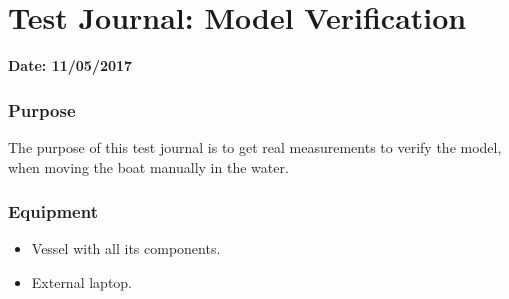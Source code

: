 \chapter{Test Journal: Model Verification}

\textbf{Date: 11/05/2017}

\subsection*{Purpose}
The purpose of this test journal is to get real measurements to verify the model, when moving the boat manually in the water.


\subsection*{Equipment}
\begin{itemize}
	\item Vessel with all its components.
	\item External laptop.
\end{itemize}

